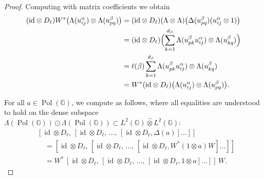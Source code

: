 \documentclass[12pt, reqno]{amsart}
\theoremstyle{definition}
\theoremstyle{remark}
\numberwithin{equation}{section}
\begin{document}
\begin{proof}
Computing with matrix coefficients we obtain
\begin{align*}
(\mathrm{id} \otimes D_{\ell}) W^{*}\bigl(\Lambda(u_{ij}^{\alpha}) \otimes \Lambda(u_{pq}^{\beta})\bigr) 
&= (\mathrm{id} \otimes D_{\ell})(\Lambda \otimes \Lambda)
   \bigl(\Delta(u_{pq}^{\beta})(u_{ij}^{\alpha} \otimes 1)\bigr) \\
&= (\mathrm{id} \otimes D_{\ell})\Bigl( \sum_{k=1}^{d_{\beta}} 
   \Lambda(u_{pk}^{\beta} u_{ij}^{\alpha}) \otimes \Lambda(u_{kq}^{\beta}) \Bigr) \\
&= \ell(\beta) \sum_{k=1}^{d_{\beta}} \Lambda(u_{pk}^{\beta} u_{ij}^{\alpha}) \otimes \Lambda(u_{kq}^{\beta}) \\
&= W^{*}(\mathrm{id} \otimes D_{\ell}) \bigl(\Lambda(u_{ij}^{\alpha}) \otimes \Lambda(u_{pq}^{\beta})\bigr).
\end{align*}

For all \(a \in \operatorname{Pol}(\mathbb{G})\), we compute as follows, where all 
equalities are understood to hold on the dense subspace 
\(\Lambda(\operatorname{Pol}(\mathbb{G})) \odot \Lambda(\operatorname{Pol}(\mathbb{G}))
\subset L^2(\mathbb{G}) \hat\otimes L^2(\mathbb{G})\):
\[
\begin{aligned}
&[\operatorname{id} \otimes D_\ell,\,
 [\operatorname{id} \otimes D_\ell,\,
  \dots,\,
 [\operatorname{id} \otimes D_\ell, \Delta(a)]\dots]] \\
&\quad = [\operatorname{id} \otimes D_\ell,\,
 [\operatorname{id} \otimes D_\ell,\,
  \dots,\,
 [\operatorname{id} \otimes D_\ell, W^*(1\otimes a)W]\dots]] \\
&\quad = W^*\,[\operatorname{id} \otimes D_\ell,\,
 [\operatorname{id} \otimes D_\ell,\,
  \dots,\,
 [\operatorname{id} \otimes D_\ell, 1\otimes a]\dots]]\,W.
\end{aligned}
\]


\end{proof}
\end{document}
